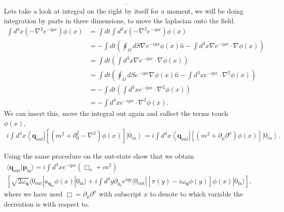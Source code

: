 \documentclass[working, oneside]{../../Preambles/tuftebook}
\begin{document}
\begin{solution}
\begin{align*}
.\end{align*}
Lets take a look at integral on the right by itself for a moment, we will be doing integration by parts in three dimensions, to move the laplacian onto the field.
\begin{align*}
    \int d^4x\left( -\nabla^2  e^{-ipx} \right)  \phi(x)  &= \int dt \int d^3x\left( -\nabla^2  e^{-ipx} \right)  \phi(x)  \\
    &= -\int dt \left( \oint_{\Omega} dS \nabla e^{-ipx} \phi \left( x \right) \hat{n}- \int d^{3}x \nabla e^{-ipx}\cdot \nabla \phi \left( x \right) \right) \\
    &= \int dt \left(  \int d^{3}x \nabla e^{-ipx}\cdot \nabla \phi \left( x \right) \right) \\
    &= \int dt \left( \oint_{\Omega} dS  e^{-ipx} \nabla \phi \left( x \right) \hat{n}- \int d^{3}x e^{-ipx}\cdot \nabla^2 \phi \left( x \right) \right) \\
    &= -\int dt \left(  \int d^{3}x e^{-ipx}\cdot \nabla^2 \phi \left( x \right) \right) \\
    &= - \int d^{4}x e^{-ipx}\cdot \nabla^2 \phi \left( x \right) 
.\end{align*}
We can insert this, move the integral out again and collect the terms touch $\phi \left( x \right) $,
\begin{align*}
    i  \int d^{4}x \left<\mathbf{q}_{out} \right| \left[ \left( m^2 + \partial_0^2 - \nabla ^2 \right) \phi \left( x \right)  \right] \left|0_{in} \right> =i  \int d^{4}x \left<\mathbf{q}_{out} \right| \left[ \left( m^2 +\partial_{\mu }\partial^{\mu } \right) \phi \left( x \right)  \right] \left|0_{in} \right>
.\end{align*}
\end{solution}
\begin{exercise}[7]
Using the same procedure on the out-state show that we obtain
\begin{align*}
\langle \mathbf{q}_{\text{out}} | \mathbf{p}_{\text{in}} \rangle = i \int d^4x e^{-ipx} (\Box_x + m^2) \\ \left[ \sqrt{2 \omega_\mathbf{q}} \langle 0_{\text{out}} | a_{\mathbf{q}_{\text{in}}} \phi(x) | 0_{\text{in}} \rangle + i \int d^4y \partial_{y_0} e^{iqy} \langle 0_{\text{out}} | \left[ \pi(y) - i \omega_\mathbf{q} \phi(y) \right] \phi(x) | 0_{\text{in}} \rangle \right], \tag{95}
\end{align*}
where we have used $\Box = \partial_\mu \partial^\mu$ with subscript $x$ to denote to which variable the derivation is with respect to.
\end{exercise}
\end{document}
